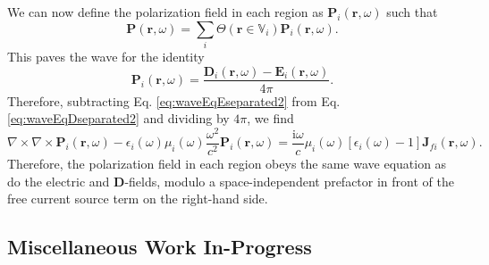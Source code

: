\documentclass{article}
\begin{document}
We can now define the polarization field in each region as $\mathbf{P}_i(\mathbf{r},\omega)$ such that
\begin{equation}
\mathbf{P}(\mathbf{r},\omega) = \sum_i\Theta(\mathbf{r}\in\mathbb{V}_i)\mathbf{P}_i(\mathbf{r},\omega).
\end{equation}
This paves the wave for the identity
\begin{equation}
\mathbf{P}_i(\mathbf{r},\omega) = \frac{\mathbf{D}_i(\mathbf{r},\omega) - \mathbf{E}_i(\mathbf{r},\omega)}{4\pi}.
\end{equation}
Therefore, subtracting Eq. \eqref{eq:waveEqEseparated2} from Eq. \eqref{eq:waveEqDseparated2} and dividing by $4\pi$, we find
\begin{equation}
\nabla\times\nabla\times\mathbf{P}_i(\mathbf{r},\omega) - \epsilon_i(\omega)\mu_i(\omega)\frac{\omega^2}{c^2}\mathbf{P}_i(\mathbf{r},\omega) = \frac{\mathrm{i}\omega}{c}\mu_i(\omega)\left[\epsilon_i(\omega) - 1\right]\mathbf{J}_{fi}(\mathbf{r},\omega).
\end{equation}
Therefore, the polarization field in each region obeys the same wave equation as do the electric and $\mathbf{D}$-fields, modulo a space-independent prefactor in front of the free current source term on the right-hand side.














\subsection{Miscellaneous Work In-Progress}
\end{document}
